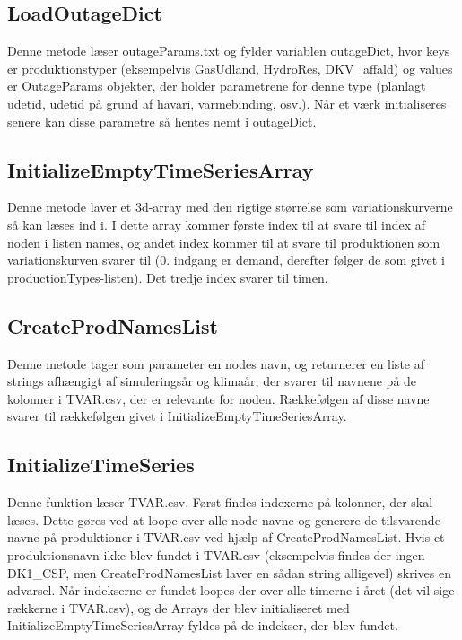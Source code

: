 \documentclass{article}
\begin{document}
\subsection{LoadOutageDict}
Denne metode læser outageParams.txt og fylder variablen outageDict, hvor keys er produktionstyper (eksempelvis GasUdland, HydroRes, DKV\_affald) og values er OutageParams objekter, der holder parametrene for denne type (planlagt udetid, udetid på grund af havari, varmebinding, osv.). Når et værk initialiseres senere kan disse parametre så hentes nemt i outageDict.

\subsection{InitializeEmptyTimeSeriesArray}
Denne metode laver et 3d-array med den rigtige størrelse som variationskurverne så kan læses ind i. I dette array kommer første index til at svare til index af noden i listen names, og andet index kommer til at svare til produktionen som variationskurven svarer til (0. indgang er demand, derefter følger de som givet i productionTypes-listen). Det tredje index svarer til timen.

\subsection{CreateProdNamesList}
Denne metode tager som parameter en nodes navn, og returnerer en liste af strings afhængigt af simuleringsår og klimaår, der svarer til navnene på de kolonner i TVAR.csv, der er relevante for noden. Rækkefølgen af disse navne svarer til rækkefølgen givet i InitializeEmptyTimeSeriesArray. 

\subsection{InitializeTimeSeries}
Denne funktion læser TVAR.csv. Først findes indexerne på kolonner, der skal læses. Dette gøres ved at loope over alle node-navne og generere de tilsvarende navne på produktioner i TVAR.csv ved hjælp af CreateProdNamesList. Hvis et produktionsnavn ikke blev fundet i TVAR.csv (eksempelvis findes der ingen DK1\_CSP, men CreateProdNamesList laver en sådan string alligevel) skrives en advarsel. Når indekserne er fundet loopes der over alle timerne i året (det vil sige rækkerne i TVAR.csv), og de Arrays der blev initialiseret med InitializeEmptyTimeSeriesArray fyldes på de indekser, der blev fundet. 
\end{document}
